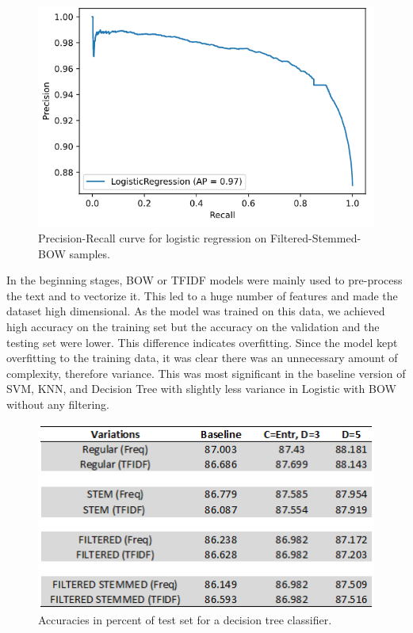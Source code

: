 \documentclass[conference , 11pt]{IEEEtran}
\begin{document}
\begin{figure}[htbp]
\centerline{\includegraphics[width=0.9\columnwidth]{precision-recall.png}}
\caption{Precision-Recall curve for logistic regression on Filtered-Stemmed-BOW samples.}
\label{fig}
\end{figure}
\FloatBarrier
In the beginning stages, BOW or TFIDF models were mainly used to pre-process the text and to vectorize it. This led to a huge number of features and made the dataset high dimensional. As the model was trained on this data, we achieved high accuracy on the training set but the accuracy on the validation and the testing set were lower. This difference indicates overfitting. Since the model kept overfitting to the training data, it was clear there was an unnecessary amount of complexity, therefore variance. This was most significant  in the baseline version of SVM, KNN, and  Decision  Tree with slightly less variance in Logistic with BOW without any filtering.


\begin{figure}[htbp]
\centerline{\includegraphics[width=0.9\columnwidth]{descision-tree-predition.png}}
\caption{Accuracies in percent of test set for a decision tree classifier.}
\label{fig}
\end{figure}
\end{document}
